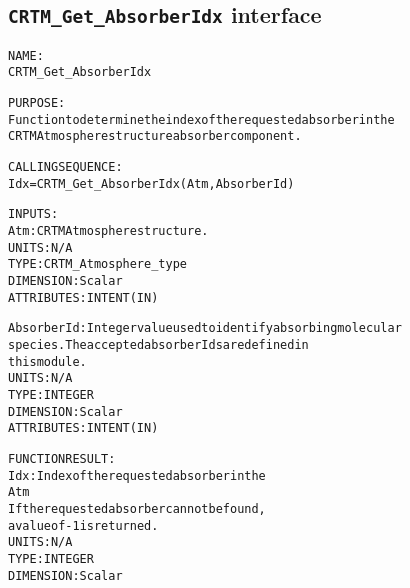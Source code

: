\subsection{\texttt{CRTM\_Get\_AbsorberIdx} interface}
  \label{sec:CRTM_Get_AbsorberIdx_interface}
  \begin{alltt}
 
  NAME:
        CRTM_Get_AbsorberIdx
  
  PURPOSE:
        Function to determine the index of the requested absorber in the
        CRTM Atmosphere structure absorber component.
 
  CALLING SEQUENCE:
        Idx = CRTM_Get_AbsorberIdx(Atm, AbsorberId)
 
  INPUTS:
        Atm:          CRTM Atmosphere structure.
                      UNITS:      N/A
                      TYPE:       CRTM_Atmosphere_type
                      DIMENSION:  Scalar
                      ATTRIBUTES: INTENT(IN)
 
        AbsorberId:   Integer value used to identify absorbing molecular
                      species. The accepted absorber Ids are defined in
                      this module.
                      UNITS:      N/A
                      TYPE:       INTEGER
                      DIMENSION:  Scalar
                      ATTRIBUTES: INTENT(IN)
 
  FUNCTION RESULT:
        Idx:          Index of the requested absorber in the 
                      Atm%Absorber array component.
                      If the requested absorber cannot be found, 
                      a value of -1 is returned.
                      UNITS:      N/A
                      TYPE:       INTEGER
                      DIMENSION:  Scalar
 
  \end{alltt}

